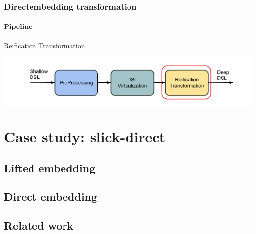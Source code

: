 \documentclass[xcolor=dvipsnames]{beamer}
\theoremstyle{definition}
\begin{document}
\begin{frame}[fragile]
    \frametitle{Directembedding transformation}
    \framesubtitle{Pipeline}
    \begin{block}{Reification Transformation}
        
    \end{block}
    \begin{center}
        \includegraphics[width=\textwidth]{img/pipeline4.pdf}
    \end{center}
\end{frame}



\section{Case study: slick-direct} %
\label{sec:Slick-direct}
\subsection{Lifted embedding} %
\label{sub:Liftedembedding}


\subsection{Direct embedding} %
\label{sub:Direct embedding}


\subsection{Related work} %
\label{sub:Related work}

\end{document}
